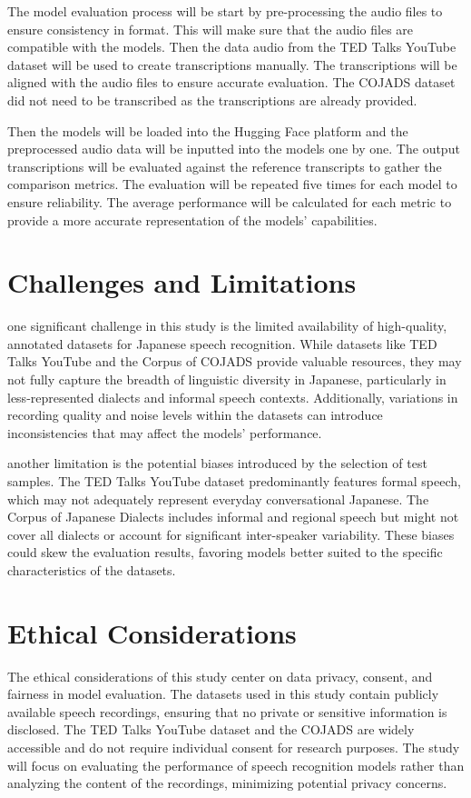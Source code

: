 The model evaluation process will be start by pre-processing the audio files to ensure consistency in format. This will make sure that the audio files are compatible with the models. Then the data audio from the TED Talks YouTube dataset will be used to create transcriptions manually. The transcriptions will be aligned with the audio files to ensure accurate evaluation. The COJADS dataset did not need to be transcribed as the transcriptions are already provided. 

Then the models will be loaded into the Hugging Face platform and the preprocessed audio data will be inputted into the models one by one. The output transcriptions will be evaluated against the reference transcripts to gather the comparison metrics. The evaluation will be repeated five times for each model to ensure reliability. The average performance will be calculated for each metric to provide a more accurate representation of the models' capabilities. 

\section{Challenges and Limitations}
one significant challenge in this study is the limited availability of high-quality, annotated datasets for Japanese speech recognition. While datasets like TED Talks YouTube and the Corpus of COJADS provide valuable resources, they may not fully capture the breadth of linguistic diversity in Japanese, particularly in less-represented dialects and informal speech contexts. Additionally, variations in recording quality and noise levels within the datasets can introduce inconsistencies that may affect the models’ performance.

another limitation is the potential biases introduced by the selection of test samples. The TED Talks YouTube dataset predominantly features formal speech, which may not adequately represent everyday conversational Japanese. The Corpus of Japanese Dialects includes informal and regional speech but might not cover all dialects or account for significant inter-speaker variability. These biases could skew the evaluation results, favoring models better suited to the specific characteristics of the datasets.

\section{Ethical Considerations}
The ethical considerations of this study center on data privacy, consent, and fairness in model evaluation. The datasets used in this study contain publicly available speech recordings, ensuring that no private or sensitive information is disclosed. The TED Talks YouTube dataset and the COJADS are widely accessible and do not require individual consent for research purposes. The study will focus on evaluating the performance of speech recognition models rather than analyzing the content of the recordings, minimizing potential privacy concerns.

